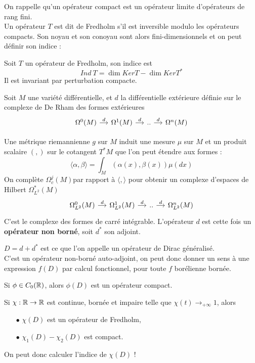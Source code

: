\documentclass{beamer}
\begin{document}
\begin{frame}
On rappelle qu'un opérateur compact est un opérateur limite d'opérateurs de rang fini. \\
Un opérateur $T$ est dit de Fredholm s'il est inversible modulo les opérateurs compacts. Son noyau et son conoyau sont alors fini-dimensionnels et on peut définir son indice :
\begin{definition}Soit $T$ un opérateur de Fredholm, son indice est
\[Ind\ T = \dim Ker T-\dim Ker T^*\] 
Il est invariant par perturbation compacte.
\end{definition}
Soit $M$ une variété différentielle, et $d$ la différentielle extérieure définie sur le complexe de De Rham des formes extérieures
\[\begin{tikzcd}[ampersand replacement=\&,column sep = small]
\Omega^0(M) \arrow{r}{d} \& \Omega^1(M) \arrow{r}{d} \& .. \arrow{r}{d} \& \Omega^n(M)  
\end{tikzcd}\]
\end{frame}

\begin{frame}
Une métrique riemannienne $g$ sur $M$ induit une mesure $\mu$ sur $M$ et un produit scalaire $(,)$ sur le cotangent $T^* M$ que l'on peut étendre aux formes :
\[\langle \alpha,\beta\rangle = \int_M (\alpha(x),\beta(x))\mu(dx)\]
On complète $\Omega^j_c(M)$par rapport à $\langle,\rangle$ pour obtenir un complexe d'espaces de Hilbert $\Omega^*_{L^2}(M)$
\[\begin{tikzcd}[ampersand replacement=\&,column sep = small]
\Omega_{L^2}^0(M) \arrow{r}{d} \& \Omega_{L^2}^1(M) \arrow{r}{d} \& .. \arrow{r}{d} \& \Omega_{L^2}^n(M)  
\end{tikzcd}\]
C'est le complexe des formes de carré intégrable. L'opérateur $d$ est cette fois un \textbf{opérateur non borné}, soit $d^*$ son adjoint.
\end{frame}

\begin{frame}
$D= d+d^*$ est ce que l'on appelle un opérateur de Dirac généralisé. \\
C'est un opérateur non-borné auto-adjoint, on peut donc donner un sens à une expression $f(D)$ par calcul fonctionnel, pour toute $f$ borélienne bornée.\\
\begin{thm}
Si $\phi\in C_0(\mathbb R)$, alors $\phi(D)$ est un opérateur compact.
\end{thm}

Si $\chi : \mathbb R\rightarrow \mathbb R$ est continue, bornée et impaire telle que $\chi (t)\rightarrow_{+\infty} 1$, alors 
\begin{itemize}
\item[$\bullet$] $\chi(D)$ est un opérateur de Fredholm,
\item[$\bullet$] $\chi_1(D)-\chi_2(D)$ est compact.
\end{itemize}
On peut donc calculer l'indice de $\chi(D)$ !
\end{frame}
\end{document}
